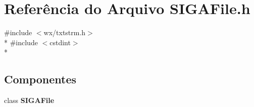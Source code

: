 \section{Referência do Arquivo S\+I\+G\+A\+File.\+h}
\label{_s_i_g_a_file_8h}
{\ttfamily \#include $<$wx/txtstrm.\+h$>$}\\*
{\ttfamily \#include $<$cstdint$>$}\\*
\subsection*{Componentes}
\begin{DoxyCompactItemize}
\item 
class {\bf S\+I\+G\+A\+File}
\end{DoxyCompactItemize}
